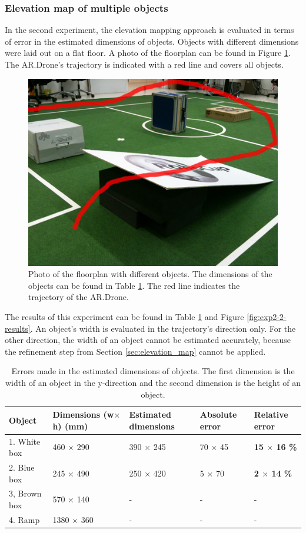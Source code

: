 \subsubsection{Elevation map of multiple objects}

In the second experiment, the elevation mapping approach is evaluated in terms of error in the estimated dimensions of objects.
Objects with different dimensions were laid out on a flat floor.
A photo of the floorplan can be found in Figure \ref{fig:exp2-setup}.
The AR.Drone's trajectory is indicated with a red line and covers all objects.

\begin{figure}[htb!]
\centering
\includegraphics[width=0.4\linewidth]{images/exp2-elevation-setup.jpg}
\caption{Photo of the floorplan with different objects. The dimensions of the objects can be found in Table \ref{tab:exp2}. The red line indicates the trajectory of the AR.Drone.}
\label{fig:exp2-setup}
\end{figure}

The results of this experiment can be found in Table \ref{tab:exp2} and Figure \ref{fig:exp2-2-results}.
An object's width is evaluated in the trajectory's direction only. 
For the other direction, the width of an object cannot be estimated accurately, because the refinement step from Section \ref{sec:elevation_map} cannot be applied.


\begin{table}[htb!]
    \centering
    \begin{tabular}
        { | l | l | l | l | l | } 
	\hline
	Object & Dimensions (w$\times$h) (\small{mm}) & Estimated dimensions & Absolute error & Relative error \\
        \hline
        1. White box	& 460 $\times$ 290	& 390 $\times$ 245	& 70 $\times$ 45	& \textbf{15 $\times$ 16 \%}\\
	2. Blue box	& 245 $\times$ 490	& 250 $\times$ 420	& 5 $\times$ 70	& \textbf{2 $\times$ 14 \%}\\
	3, Brown box	& 570 $\times$ 140	& - 					& - 				& - \\
	4. Ramp		& 1380 $\times$ 360	& - 					& - 				& - \\
	\hline
    \end{tabular}
    \caption{Errors made in the estimated dimensions of objects. The first dimension is the width of an object in the y-direction and the second dimension is the height of an object. }
    \label{tab:exp2}
\end{table}

